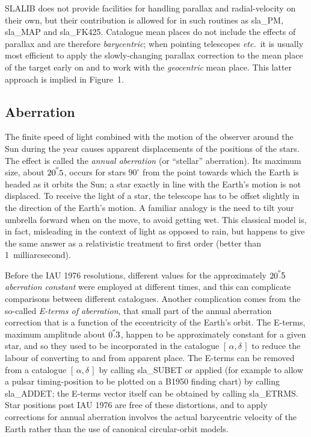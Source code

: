 \documentclass[11pt,twoside]{article}
\newcommand{\radec}     {$[\,\alpha,\delta\,]$}
\newcommand{\arcsec}[2] {\arcseci{#1}$\hspace{-0.4em}.#2$}
\newcommand{\arcsec}[2] {
      {$#1\hspace{-0.05em}^{'\hspace{-0.1em}'}\hspace{-0.4em}.#2$}
   }
\newcommand{\arcseci}[1] {$#1\hspace{-0.05em}$\raisebox{-0.5ex}
                         {$^{'\hspace{-0.1em}'}$}}
\renewcommand{\arcseci}[1] {$#1\hspace{-0.05em}^{'\hspace{-0.1em}'}$}
\begin{document}
SLALIB does not provide facilities for handling parallax
and radial-velocity on their own, but their contribution is
allowed for in such routines as
sla\_PM,
sla\_MAP
and
sla\_FK425.
Catalogue mean
places do not include the effects of parallax and are therefore
{\it barycentric};  when pointing telescopes {\it etc.}\ it is
usually most efficient to apply the slowly-changing
parallax correction to the mean place of the target early on
and to work with the {\it geocentric}\/ mean place.  This latter
approach is implied in Figure~1.

\subsection{Aberration}
The finite speed of light combined with the motion of the observer
around the Sun during the year causes apparent displacements of
the positions of the stars.  The effect is called
the {\it annual aberration} (or ``stellar''
aberration).  Its maximum size, about \arcsec{20}{5},
occurs for stars $90^{\circ}$ from the point towards which
the Earth is headed as it orbits the Sun;  a star exactly in line with
the Earth's motion is not displaced.  To receive the light of
a star, the telescope has to be offset slightly in the direction of
the Earth's motion.  A familiar analogy is the need to tilt your
umbrella forward when on the move, to avoid getting wet.  This
classical model is,
in fact, misleading in the context of light as opposed
to rain, but happens to give the same answer as a relativistic
treatment to first order (better than 1~milliarcsecond).

Before the IAU 1976 resolutions, different
values for the approximately
\arcsec{20}{5} {\it aberration constant}\/ were employed
at different times, and this can complicate comparisons
between different catalogues.  Another complication comes from
the so-called {\it E-terms of aberration},
that small part of the annual aberration correction that is a
function of the eccentricity of the Earth's orbit.  The E-terms,
maximum amplitude about \arcsec{0}{3},
happen to be approximately constant for a given star, and so they
used to be incorporated in the catalogue \radec\/
to reduce the labour of converting to and from apparent place.
The E-terms can be removed from a catalogue \radec\/ by
calling
sla\_SUBET
or applied (for example to allow a pulsar
timing-position to be plotted on a B1950 finding chart)
by calling
sla\_ADDET;
the E-terms vector itself can be obtained by calling
sla\_ETRMS.
Star positions post IAU 1976 are free of these distortions, and to
apply corrections for annual aberration involves the actual
barycentric velocity of the Earth rather than the use of
canonical circular-orbit models.
\end{document}
